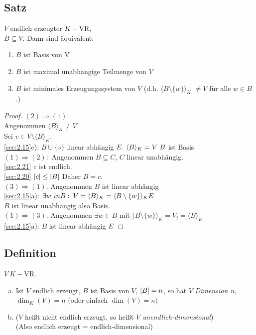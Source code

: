 \subsection{Satz}
$V$ endlich erzeugter $K-$VR,\\
$B \subseteq V.$ Dann sind äquivalent:\\
\begin{enumerate}[(1)]
\item $B$ ist Basis von V
\item $B$ ist maximal unabhängige Teilmenge von $V$
\item $B$ ist minimales Erzeugungssystem von $V$ (d.h. $\langle B \setminus \{w\}\rangle_K$ $\ne V$ für alle $w \in B$.)
\end{enumerate}
\begin{proof}
$(2) \Rightarrow (1)$\\
Angenommen $\langle B \rangle_K \ne V$\\
Sei $v \in V \setminus \langle B \rangle_K$.\\
\ref{sec:2.15}c): $B \cup \{v\}$ linear abhängig $\Lightning.\ \langle B \rangle_K = V\ B$ ist Basis\\
$(1) \Rightarrow (2):$ Angenommen $B \subseteq C,\, C$ linear unabhängig.\\
\ref{sec:2.21} c ist endlich.\\
\ref{sec:2.20} $\lvert c \rvert \leq \lvert B \rvert$ Daher $B = c$.\\
$(3) \Rightarrow (1)$. Angenommen $B$ ist linear abhängig\\
\ref{sec:2.15}a): $\exists w\ in B:\: V = \langle B \rangle_K = \langle B \setminus \{w\}\rangle_K \Lightning$\\
$B$ ist linear unabhängig also Basis.\\
$(1) \Rightarrow (3)$. Angenommen $\exists w \in B$ mit $\rangle B \setminus \{w\}\rangle_K = V_i = \langle B \rangle_K$\\
\ref{sec:2.15}a): $B$ ist linear abhängig $\Lightning$
\end{proof}
\subsection{Definition}
$V\ K-$VR.
\begin{enumerate}[a)]
\item Ist $V$ endlich erzeugt, $B$ ist Basis von $V$, $\lvert B \rvert = n$, so hat $V$ \emph{Dimension n},\\
$\dim_K(V) = n$ (oder einfach $\dim(V) = n)$
\item ($V$ hei\ss t nicht endlich erzeugt, so hei\ss t $V$ \emph{unendlich-dimensional})\\
(Also endlich erzeugt = endlich-dimensional)
\end{enumerate}
\printindex

